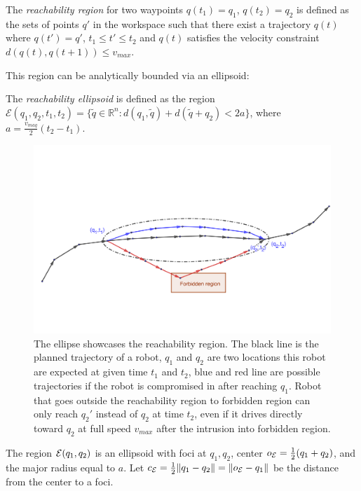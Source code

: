\documentclass[journal]{IEEEtran}  %
\begin{document}

\begin{definition}\label{sec:ellipsoidal definition}
	The \emph{reachability region} for two waypoints $q(t_1)=q_1$, $q(t_2)=q_2$ is defined as the sets of points $q'$ in the workspace such that there exist a trajectory $q(t)$ where $q(t')=q'$, $t_1\leq t' \leq t_2$ and $q(t)$ satisfies the velocity constraint $d(q(t),q(t+1))\leq v_{max}$.
\end{definition}
This region can be analytically bounded via an ellipsoid:
\begin{definition}\label{def:Reachability}
	The \emph{reachability ellipsoid} is defined as the region  $\mathcal{E}(q_1,q_2,t_{1},t_{2})=\{\tilde{q}\in\mathbb{R}^n: d(q_1,\tilde{q})+d(\tilde{q}+q_2)<2a\}$, where $a=\frac{v_{maq}}{2}(t_2-t_1)$.
\end{definition}

 \begin{figure}
    \centering
    \includegraphics[width=0.6\linewidth]{Reachability}
    \caption{The ellipse showcases the reachability region. The black line is the planned trajectory of a robot, $q_1$ and $q_2$ are two locations this robot are expected at given time $t_1$ and $t_2$, blue and red line are possible trajectories if the robot is compromised in after reaching $q_1$. Robot that goes outside the reachability region to forbidden region can only reach $q_{2}'$ instead of $q_{2}$ at time $t_{2}$, even if it drives directly toward $q_{2}$ at full speed $v_{max}$ after the intrusion into forbidden region.}
    \label{fig:EllipseConstraintExample}
  \end{figure}
 

The region $\mathcal{E}(q_1,q_2)$ is an ellipsoid with foci at $q_1,q_2$, center $o_{\mathcal{E}} = \frac{1}{2}(q_1+q_2)$, and the major radius equal to $a$. Let $c_{\mathcal{E}}=\frac{1}{2}\lVert q_1-q_2\rVert=\lVert o_{\mathcal{E}}-q_1\rVert$ be the distance from the center to a foci.
\end{document}
